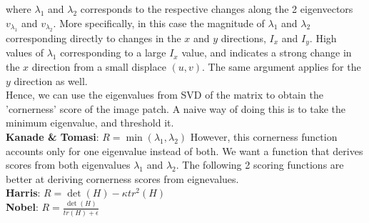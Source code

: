 \documentclass[12pt]{article}
\begin{document}
where $\lambda_1$ and $\lambda_2$ corresponds to the respective changes along the 2 eigenvectors $v_{\lambda_1}$ and $v_{\lambda_2}$. More specifically, in this case the magnitude of $\lambda_1$ and $\lambda_2$ corresponding directly to changes in the $x$ and $y$ directions, $I_x$ and $I_y$. High values of $\lambda_1$ corresponding to a large $I_x$ value, and indicates a strong change in the $x$ direction from a small displace $(u, v)$. The same argument applies for the $y$ direction as well.\\

Hence, we can use the eigenvalues from SVD of the matrix to obtain the 'cornerness' score of the image patch. A naive way of doing this is to take the minimum eigenvalue, and threshold it.\\

\textbf{Kanade \& Tomasi}: $R = \min(\lambda_1, \lambda_2)$
However, this cornerness function accounts only for one eigenvalue instead of both. We want a function that derives scores from both eigenvalues $\lambda_1$ and $\lambda_2$. The following 2 scoring functions are better at deriving cornerness scores from eignevalues.\\

\textbf{Harris}: $R = \det(H) - \kappa tr^2(H)$\\
\textbf{Nobel}: $R = \frac{\det(H)}{tr(H) + \epsilon}$\\
\end{document}
